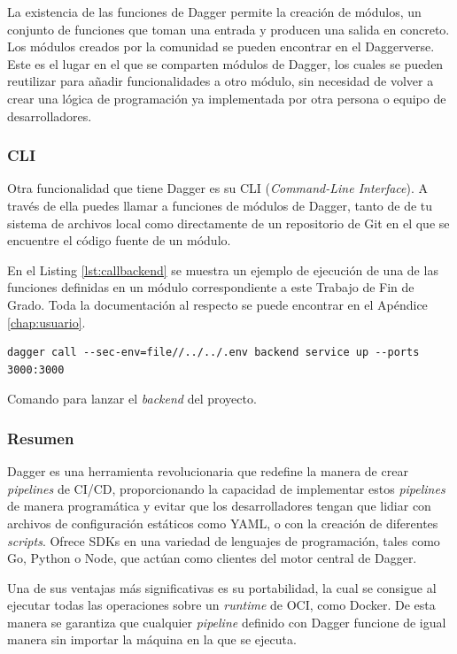 La existencia de las funciones de Dagger permite la creación de módulos, un conjunto de funciones que toman una entrada y producen una salida en concreto. Los módulos creados por la comunidad se pueden encontrar en el Daggerverse\cite{daggerverse}. Este es el lugar en el que se comparten módulos de Dagger, los cuales se pueden reutilizar para añadir funcionalidades a otro módulo, sin necesidad de volver a crear una lógica de programación ya implementada por otra persona o equipo de desarrolladores.

\subsubsection*{CLI}

Otra funcionalidad que tiene Dagger es su CLI\cite{cli} (\textit{Command-Line Interface}). A través de ella puedes llamar a funciones de módulos de Dagger, tanto de de tu sistema de archivos local como directamente de un repositorio de Git en el que se encuentre el código fuente de un módulo.

En el Listing \ref{lst:callbackend} se muestra un ejemplo de ejecución de una de las funciones definidas en un módulo correspondiente a este Trabajo de Fin de Grado. Toda la documentación al respecto se puede encontrar en el Apéndice \ref{chap:usuario}.

\begin{listing}[!ht]
  \begin{verbatim}
dagger call --sec-env=file//../../.env backend service up --ports 3000:3000
  \end{verbatim}
  \caption{Comando para lanzar el \textit{backend} del proyecto.}
  \label{lst:callbackend}
\end{listing}

\subsubsection*{Resumen}

Dagger es una herramienta revolucionaria que redefine la manera de crear \textit{pipelines} de CI/CD, proporcionando la capacidad de implementar estos \textit{pipelines} de manera programática y evitar que los desarrolladores tengan que lidiar con archivos de configuración estáticos como YAML, o con la creación de diferentes \textit{scripts}. Ofrece SDKs en una variedad de lenguajes de programación, tales como Go, Python o Node, que actúan como clientes del motor central de Dagger.

Una de sus ventajas más significativas es su portabilidad, la cual se consigue al ejecutar todas las operaciones sobre un \textit{runtime} de OCI, como Docker. De esta manera se garantiza que cualquier \textit{pipeline} definido con Dagger funcione de igual manera sin importar la máquina en la que se ejecuta.

